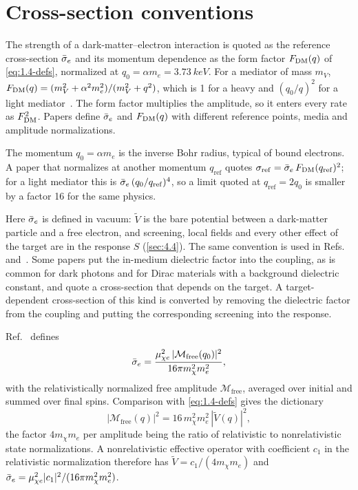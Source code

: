 \section{Cross-section conventions}\label{app:A.9}

The strength of a dark-matter--electron interaction is quoted as the reference cross-section $\bar{\sigma}_{e}$ and its momentum dependence as the form factor $F_{\mathrm{DM}}(q)$ of \cref{eq:1.4-defs}, normalized at $q_0 = \alpha m_e = \SI{3.73}{keV}$. For a mediator of mass $m_V$, $F_{\mathrm{DM}}(q) = (m_V^2 + \alpha^2m_e^2)/(m_V^2 + q^2)$, which is 1 for a heavy and $(q_0/q)^2$ for a light mediator~\cite[Eqs.~(11) and (12)]{knapen2021dark}. The form factor multiplies the amplitude, so it enters every rate as $F_{\mathrm{DM}}^2$. Papers define $\bar{\sigma}_{e}$ and $F_{\mathrm{DM}}(q)$ with different reference points, media and amplitude normalizations.

The momentum $q_0 = \alpha m_e$ is the inverse Bohr radius, typical of bound electrons. A paper that normalizes at another momentum $q_{\mathrm{ref}}$ quotes $\sigma_{\mathrm{ref}} = \bar{\sigma}_{e}\,F_{\mathrm{DM}}(q_{\mathrm{ref}})^2$; for a light mediator this is $\bar{\sigma}_{e}\,(q_0/q_{\mathrm{ref}})^4$, so a limit quoted at $q_{\mathrm{ref}} = 2q_0$ is smaller by a factor 16 for the same physics.

Here $\bar{\sigma}_{e}$ is defined in vacuum: $\tilde V$ is the bare potential between a dark-matter particle and a free electron, and screening, local fields and every other effect of the target are in the response $S$ (\cref{sec:4.4}). The same convention is used in Refs.~\cite[Eq.~(8) and the paragraph after it]{knapen2021dark} and~\cite[below Eq.~(S.8)]{hochberg2021determining}. Some papers put the in-medium dielectric factor into the coupling, as is common for dark photons and for Dirac materials with a background dielectric constant, and quote a cross-section that depends on the target. A target-dependent cross-section of this kind is converted by removing the dielectric factor from the coupling and putting the corresponding screening into the response.

Ref.~\cite[Eq.~(3.8)]{essig2016direct} defines
\begin{equation*}
  \bar{\sigma}_{e} = \frac{\mu_{\chi e}^2\,|\mathcal{M}_{\mathrm{free}}(q_0)|^2}{16\pi m_\chi^2m_e^2} ,
\end{equation*}
with the relativistically normalized free amplitude $\mathcal{M}_{\mathrm{free}}$, averaged over initial and summed over final spins. Comparison with \cref{eq:1.4-defs} gives the dictionary
\begin{equation}
  |\mathcal{M}_{\mathrm{free}}(q)|^2 = 16\,m_\chi^2m_e^2\,|\tilde V(q)|^2 ,
  \label{eq:A.9-M}
\end{equation}
the factor $4m_\chi m_e$ per amplitude being the ratio of relativistic to nonrelativistic state normalizations. A nonrelativistic effective operator with coefficient $c_1$ in the relativistic normalization therefore has $\tilde V = c_1/(4m_\chi m_e)$ and $\bar{\sigma}_{e} = \mu_{\chi e}^2|c_1|^2/(16\pi m_\chi^2m_e^2)$.

